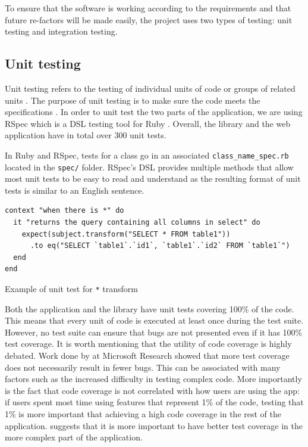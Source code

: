 To ensure that the software is working according to the requirements and that future re-factors will be made easily, the project uses two types of testing: unit testing and integration testing.

\subsection{Unit testing}

Unit testing refers to the testing of individual units of code or groups of related units \citep{unit_testing}. The purpose of unit testing is to make sure the code meets the specifications \citep{Olan2003}. In order to unit test the two parts of the application, we are using RSpec which is a DSL testing tool for Ruby \citep{wiki:rspec}. Overall, the library and the web application have in total over 300 unit tests.

In Ruby and RSpec, tests for a class go in an associated \texttt{class\_name\_spec.rb} located in the \texttt{spec/} folder. RSpec's DSL provides multiple methods that allow most unit tests to be easy to read and understand as the resulting format of unit tests is similar to an English sentence.

\begin{code}
\begin{verbatim}
context "when there is *" do
  it "returns the query containing all columns in select" do
    expect(subject.transform("SELECT * FROM table1"))
      .to eq("SELECT `table1`.`id1`, `table1`.`id2` FROM `table1`")
  end
end
\end{verbatim}
\caption{Example of unit test for \texttt{*} transform}
\label{fig:example_unit_test}
\end{code}

Both the application and the library have unit tests covering 100\% of the code. This means that every unit of code is executed at least once during the test suite. However, no test suite can ensure that bugs are not presented even if it has 100\% test coverage. It is worth mentioning that the utility of code coverage is highly debated. Work done by \cite{msft_testing} at Microsoft Research showed that more test coverage does not necessarily result in fewer bugs. This can be associated with many factors such as the increased difficulty in testing complex code. More importantly is the fact that code coverage is not correlated with how users are using the app: if users spent most time using features that represent 1\% of the code, testing that 1\% is more important that achieving a high code coverage in the rest of the application. \cite{msft_testing} suggests that it is more important to have better test coverage in the more complex part of the application.

